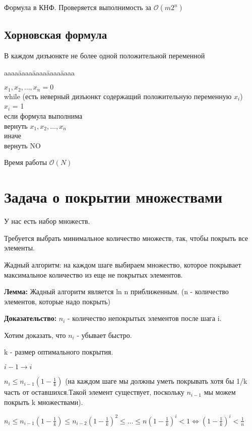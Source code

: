 \documentclass[12pt]{article}
\def\t{\texttt}
\def\O{\mathcal{O}}
\newenvironment{MyTabbing}{
\t\bgroup
\begin{tabbing}
aaaa\=aaaa\=aaaa\=aaaa\=aaaa\kill
}{
\end{tabbing}
\t\egroup
}
\begin{document}
   Формула в КНФ. Проверяется выполнимость за $\O(m 2^n)$

\subsection{Хорновская формула}

В каждом дизъюнкте не более одной положительной переменной
\begin{MyTabbing}
$x_1, x_2, \ldots, x_n = 0$\\
while (есть неверный дизъюнкт содержащий положительную переменную $x_i$)\\
\>$x_i$ = 1\\
если формула выполнима\\
\>вернуть $x_1, x_2, \ldots, x_n$\\
иначе\\
\>вернуть NO\\
\end{MyTabbing}

Время работы $\O(N)$

\section{Задача о покрытии множествами}

У нас есть набор множеств. 

Требуется выбрать минимальное количество множеств, так, чтобы покрыть все элементы.

Жадный алгоритм: на каждом шаге выбираем множество, которое покрывает максимальное количество из еще не покрытых элементов.

{\bf Лемма:} Жадный алгоритм является ln n  приближенным. (n - количество элементов, которые надо покрыть)

{\bf Доказательство:} 
$n_i$ - количество непокрытых элементов после шага i.

Хотим доказать, что $n_i$ - убывает быстро.

k - размер оптимального покрытия.

$i - 1 \to i$

$n_i \le n_{i - 1}(1 - \frac{1}{k})$ (на каждом шаге мы должны уметь покрывать хотя бы 1/k часть от оставшихся.Такой элемент существует, поскольку $n_{i - 1}$ мы можем покрыть k множествами).

 
$n_i \le n_{i - 1}(1 - \frac{1}{k})\le n_{i - 2}(1 - \frac{1}{k})^2 \le\ldots \le n(1 - \frac{1}{k})^i < 1 \Leftrightarrow (1 - \frac{1}{k})^i < \frac{1}{n}$
\end{document}
